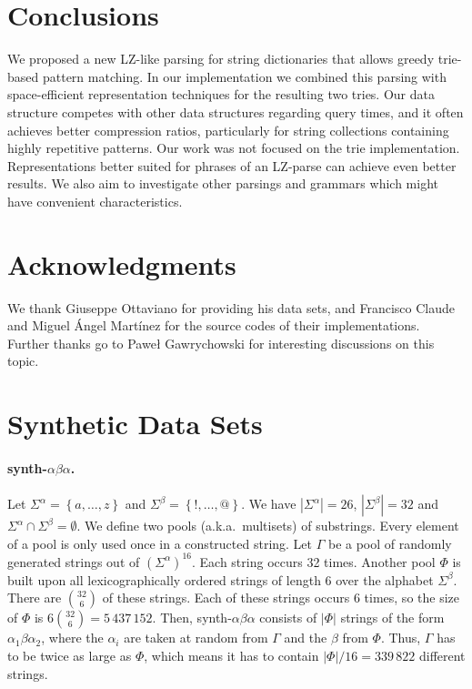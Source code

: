 \documentclass{llncs}
\newcommand{\abs}[1]{\ensuremath{\left\vert#1\right\vert}}
\begin{document}
\section{Conclusions}
We proposed a new LZ-like parsing for string dictionaries that allows greedy trie-based pattern matching. In our implementation we combined this parsing with space-efficient representation techniques for the resulting two tries.
Our data structure competes with other data structures regarding query times, and it often achieves better compression ratios, particularly for string collections containing highly repetitive patterns. 
Our work was not focused on the trie implementation. Representations better suited for phrases of an LZ-parse can achieve even better results. We also aim to investigate other parsings and grammars which might have convenient characteristics.

\section*{Acknowledgments}
We thank Giuseppe Ottaviano for providing his data sets, and Francisco Claude and Miguel \'Angel Mart\'inez for the source codes of their implementations. Further thanks go to Pawe\l{} Gawrychowski for interesting discussions on this topic.



\appendix
\section{Synthetic Data Sets}
\label{sect:syntheticDatasets}
\paragraph{synth-$\alpha\beta\alpha$.}
Let $\Sigma^\alpha = \left\lbrace a,\dotsc,z\right\rbrace$ and $\Sigma^\beta = \left\lbrace !,\dotsc,@\right\rbrace$. We have $\abs{\Sigma^\alpha} = 26$, $\abs{\Sigma^\beta} = 32$ and $\Sigma^\alpha \cap \Sigma^\beta = \emptyset$. 
We define two pools (a.k.a.~multisets) of substrings. Every element of a pool is only used once in a constructed string.
Let $\Gamma$ be a pool of randomly generated strings out of $\left(\Sigma^\alpha\right)^{16}$. Each string occurs 32 times. Another pool $\Phi$ is built upon all lexicographically ordered strings of length 6 over the alphabet $\Sigma^\beta$. There are $\binom{32}{6}$ of these strings. Each of these strings occurs 6 times, so the size of $\Phi$ is $6 \binom{32}{6} = 5\,437\,152$.
Then, synth-$\alpha\beta\alpha$ consists of $\abs{\Phi}$ strings of the form $\alpha_1\beta\alpha_2$, where the $\alpha_i$ are taken at random from $\Gamma$ and the $\beta$ from $\Phi$. Thus, $\Gamma$ has to be twice as large as $\Phi$, which means it has to contain $\abs{\Phi} / 16 = 339\,822$ different strings.
\end{document}
